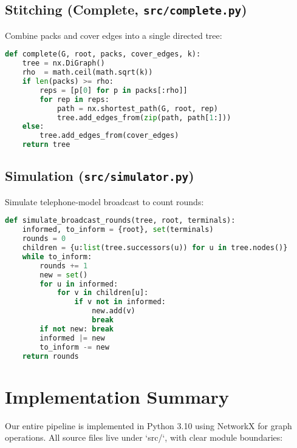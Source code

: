\documentclass[12pt]{article}
\begin{document}
\subsection*{Stitching (Complete, \texttt{src/complete.py})}
Combine packs and cover edges into a single directed tree:
\begin{lstlisting}[language=Python,caption={Building the final multicast tree}]
def complete(G, root, packs, cover_edges, k):
    tree = nx.DiGraph()
    rho  = math.ceil(math.sqrt(k))
    if len(packs) >= rho:
        reps = [p[0] for p in packs[:rho]]
        for rep in reps:
            path = nx.shortest_path(G, root, rep)
            tree.add_edges_from(zip(path, path[1:]))
    else:
        tree.add_edges_from(cover_edges)
    return tree
\end{lstlisting}

\subsection*{Simulation (\texttt{src/simulator.py})}
Simulate telephone‐model broadcast to count rounds:
\begin{lstlisting}[language=Python,caption={simulate\_broadcast\_rounds}]
def simulate_broadcast_rounds(tree, root, terminals):
    informed, to_inform = {root}, set(terminals)
    rounds = 0
    children = {u:list(tree.successors(u)) for u in tree.nodes()}
    while to_inform:
        rounds += 1
        new = set()
        for u in informed:
            for v in children[u]:
                if v not in informed:
                    new.add(v)
                    break
        if not new: break
        informed |= new
        to_inform -= new
    return rounds
\end{lstlisting}

\section{Implementation Summary}
\label{sec:impl}

Our entire pipeline is implemented in Python 3.10 using NetworkX for graph operations.  All source files live under `src/`, with clear module boundaries:
\end{document}

